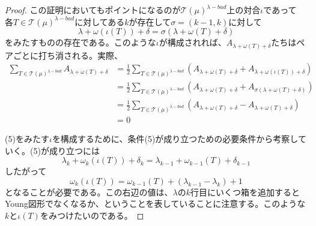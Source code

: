 \documentclass{ltjsreport}
\begin{document}
\begin{proof}
    この証明においてもポイントになるのが$\mathcal{T}(\mu)^{\lambda-bad}$上の対合$\iota$であって
    各$T\in\mathcal{T}(\mu)^{\lambda-bad}$に対してある$k$が存在して$\sigma=(k-1,k)$に対して
    \begin{equation}
    \lambda+\omega(\iota(T))+\delta=\sigma(\lambda+\omega(T)+\delta)
    \end{equation}
    をみたすものの存在である。このような$\iota$が構成されれば、$A_{\lambda+\omega(T)+\delta}$たちはペアごとに打ち消される。実際、
    \begin{align*}
        \sum_{T\in\mathcal{T}(\mu)^{\lambda-bad}}A_{\lambda+\omega(T)+\delta}
        &=\frac{1}{2}\sum_{T\in\mathcal{T}(\mu)^{\lambda-bad}}(A_{\lambda+\omega(T)+\delta}+A_{\lambda+\omega(\iota(T))+\delta})\\
        &=\frac{1}{2}\sum_{T\in\mathcal{T}(\mu)^{\lambda-bad}}(A_{\lambda+\omega(T)+\delta}+A_{\sigma(\lambda+\omega(T)+\delta)})\\
        &=\frac{1}{2}\sum_{T\in\mathcal{T}(\mu)^{\lambda-bad}}(A_{\lambda+\omega(T)+\delta}-A_{\lambda+\omega(T)+\delta})\\
        &=0
    \end{align*}

    (5)をみたす$\iota$を構成するために、条件(5)が成り立つための必要条件から考察していく。(5)が成り立つには
    \[
    \lambda_k+\omega_k(\iota(T))+\delta_k=\lambda_{k-1}+\omega_{k-1}(T)+\delta_{k-1}    
    \]
    したがって
    \begin{equation}
    \omega_k(\iota(T))=\omega_{k-1}(T)+(\lambda_{k-1}-\lambda_k)+1    
    \end{equation}
    となることが必要である。この右辺の値は、$\lambda$の$k$行目にいくつ箱を追加するとYoung図形でなくなるか、ということを表していることに注意する。このような$k$と$\iota(T)$をみつけたいのである。


\end{proof}
\end{document}
